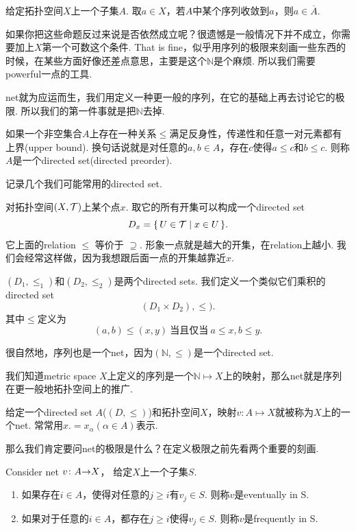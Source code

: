 \begin{proposition}
给定拓扑空间$X$上一个子集$A$. 取$a \in X$，若$A$中某个序列收敛到$a$，则$a \in \overline{A}$.
\end{proposition}

如果你把这些命题反过来说是否依然成立呢？很遗憾是一般情况下并不成立，你需要加上$X$第一个可数这个条件. That is fine，似乎用序列的极限来刻画一些东西的时候，在某些方面好像还差点意思，主要是这个$\mathbb{N}$是个麻烦. 所以我们需要powerful一点的工具.

net就为应运而生，我们用定义一种更一般的序列，在它的基础上再去讨论它的极限. 所以我们的第一件事就是把$\mathbb{N}$去掉.

\begin{definition}
\rm 如果一个非空集合$A$上存在一种关系$\leq$满足反身性，传递性和任意一对元素都有上界(upper bound). 换句话说就是对任意的$a,b \in A$，存在$c$使得$a \leq c$和$b \leq c$. 则称$A$是一个directed set(directed preorder).
\end{definition}

记录几个我们可能常用的directed set.

\begin{example}
对拓扑空间$(X,\mathcal{T})$上某个点$x$. 取它的所有开集可以构成一个directed set\[D_x = \{\,U \in \mathcal{T}\mid x \in U\,\}.\]它上面的relation $\leq$ 等价于 $\supseteq$. 形象一点就是越大的开集，在relation上越小. 我们会经常这样做，因为我想跟后面一点的开集越靠近$x$. 
\end{example}

\begin{example}
$(D_1,\leq_1)$和$(D_2,\leq_2)$是两个directed sets. 我们定义一个类似它们乘积的directed set\[(D_1 \times D_2), \leq).\]其中$\leq$定义为\[(a,b) \leq (x,y)\ \text{当且仅当}\ a \leq x , b \leq y.\]
\end{example}


\begin{remark}
很自然地，序列也是一个net，因为$(\mathbb{N},\leq)$是一个directed set.
\end{remark}

我们知道metric space $X$上定义的序列是一个$\mathbb{N} \mapsto X$上的映射，那么net就是序列在更一般地拓扑空间上的推广.

\begin{definition}
给定一个directed set $A$($(D,\leq)$)和拓扑空间$X$，映射$v \colon A \mapsto X$就被称为$X$上的一个net.  常常用$x.= x_\alpha(\alpha \in A)$表示.
\end{definition}


那么我们肯定要问net的极限是什么？在定义极限之前先看两个重要的刻画.
\begin{definition}
Consider net ${v}\colon{A}{\to}{X}$， 给定$X$上一个子集$S$. 
\begin{enumerate}
	\item 如果存在$i \in A$，使得对任意的$j \geq i$有$v_j \in S$. 则称$v$是eventually in S.
	\item 如果对于任意的$i \in A$，都存在$j \geq i$使得$v_j \in S$. 则称$v$是frequently in S.
\end{enumerate}
\end{definition}

